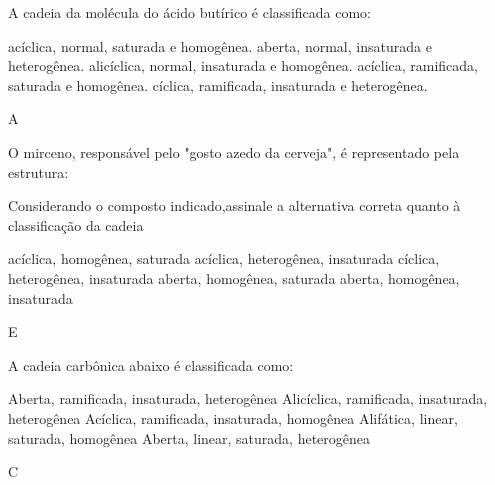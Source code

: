 \documentclass[10pt]{scrartcl}
\begin{document}
\begin{exercise}[points=1]
A cadeia da molécula do ácido butírico é classificada
como:


\begin{choice}
\choice acíclica, normal, saturada e homogênea.
\choice aberta, normal, insaturada e heterogênea.
\choice alicíclica, normal, insaturada e homogênea.
\choice acíclica, ramificada, saturada e homogênea.
\choice cíclica, ramificada, insaturada e heterogênea.
\end{choice}
\end{exercise}
\begin{solution}
A
\end{solution}






\begin{exercise}[points=1]
O mirceno, responsável pelo "gosto azedo da cerveja", é representado pela estrutura:

\begin{center}
\end{center}

Considerando o composto indicado,assinale a alternativa correta quanto à classificação da cadeia

\begin{choice}
\choice acíclica, homogênea, saturada
\choice acíclica, heterogênea, insaturada
\choice cíclica, heterogênea, insaturada
\choice aberta, homogênea, saturada
\choice aberta, homogênea, insaturada
\end{choice}
\end{exercise}
\begin{solution}
E
\end{solution}







\begin{exercise}[points=1]
A cadeia carbônica abaixo é classificada como:

\begin{choice}
\choice Aberta, ramificada, insaturada, heterogênea
\choice Alicíclica, ramificada, insaturada, heterogênea
\choice Acíclica, ramificada, insaturada, homogênea
\choice Alifática, linear, saturada, homogênea
\choice  Aberta, linear, saturada, heterogênea
\end{choice}
\end{exercise}
\begin{solution}
C
\end{solution}
\end{document}
